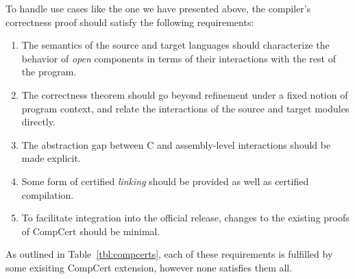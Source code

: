 \documentclass[acmsmall,screen,review,anonymous]{acmart}
\begin{document}
To handle use cases like the one we have presented above,
the compiler's correctness proof
should satisfy the following requirements:
\begin{enumerate}
\item \label{req:opensem}
  The semantics of the source and target languages
  should characterize the behavior of \emph{open} components
  in terms of their interactions with the rest of the program.
\item \label{req:opensim}
  The correctness theorem
  should go beyond refinement under a fixed notion of program context, and relate
  the interactions of the source and target modules directly.
\item \label{req:openabs}
  The abstraction gap between C and assembly-level
  interactions should be made explicit.
\item \label{req:linking}
  Some form of certified \emph{linking}
  should be provided as well as certified compilation.
\item \label{req:complexity}
  To facilitate integration into the official release,
  changes to the existing proofs of CompCert
  should be minimal.
\end{enumerate}
As outlined in Table~\ref{tbl:compcerts},
each of these requirements is fulfilled
by some exisiting CompCert extension,
however none satisfies them all.
%


\end{document}
